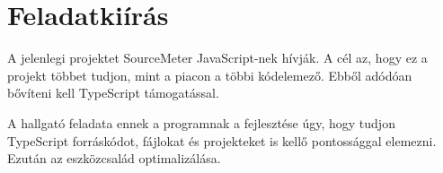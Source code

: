 \chapter*{Feladatkiírás}

\noindent

A jelenlegi projektet SourceMeter JavaScript-nek hívják.
A cél az, hogy ez a projekt többet tudjon, mint a piacon a többi kódelemező.
Ebből adódóan bővíteni kell TypeScript támogatással.

\noindent

A hallgató feladata ennek a programnak a fejlesztése úgy, hogy tudjon TypeScript forráskódot, fájlokat és projekteket is kellő pontossággal elemezni.
Ezután az eszközcsalád optimalizálása.
